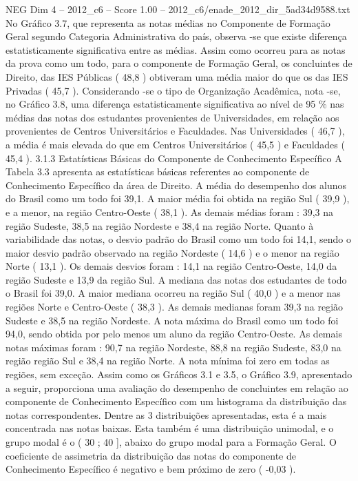 \begin{textsample}{NEG Dim 4 – 2012\_c6 – Score 1.00 – 2012\_c6/enade\_2012\_dir\_5ad34d9588.txt}
No Gráfico 3.7, que representa as notas médias no Componente de Formação Geral segundo Categoria Administrativa do país, observa -se que existe diferença estatisticamente significativa entre as médias.
Assim como ocorreu para as notas da prova como um todo, para o componente de Formação Geral, os concluintes de Direito, das IES Públicas ( 48,8 ) obtiveram uma média maior do que os das IES Privadas ( 45,7 ).
Considerando -se o tipo de Organização Acadêmica, nota -se, no Gráfico 3.8, uma diferença estatisticamente significativa ao nível de 95 \% nas médias das notas dos estudantes provenientes de Universidades, em relação aos provenientes de Centros Universitários e Faculdades.
Nas Universidades ( 46,7 ), a média é mais elevada do que em Centros Universitários ( 45,5 ) e Faculdades ( 45,4 ). 3.1.3 Estatísticas Básicas do Componente de Conhecimento Específico A Tabela 3.3 apresenta as estatísticas básicas referentes ao componente de Conhecimento Específico da área de Direito.
A média do desempenho dos alunos do Brasil como um todo foi 39,1.
A maior média foi obtida na região Sul ( 39,9 ), e a menor, na região Centro-Oeste ( 38,1 ).
As demais médias foram : 39,3 na região Sudeste, 38,5 na região Nordeste e 38,4 na região Norte.
Quanto à variabilidade das notas, o desvio padrão do Brasil como um todo foi 14,1, sendo o maior desvio padrão observado na região Nordeste ( 14,6 ) e o menor na região Norte ( 13,1 ).
Os demais desvios foram : 14,1 na região Centro-Oeste, 14,0 da região Sudeste e 13,9 da região Sul.
A mediana das notas dos estudantes de todo o Brasil foi 39,0.
A maior mediana ocorreu na região Sul ( 40,0 ) e a menor nas regiões Norte e Centro-Oeste ( 38,3 ).
As demais medianas foram 39,3 na região Sudeste e 38,5 na região Nordeste.
A nota máxima do Brasil como um todo foi 94,0, sendo obtida por pelo menos um aluno da região Centro-Oeste.
As demais notas máximas foram : 90,7 na região Nordeste, 88,8 na região Sudeste, 83,0 na região região Sul e 38,4 na região Norte.
A nota mínima foi zero em todas as regiões, sem exceção.
Assim como os Gráficos 3.1 e 3.5, o Gráfico 3.9, apresentado a seguir, proporciona uma avaliação do desempenho de concluintes em relação ao componente de Conhecimento Específico com um histograma da distribuição das notas correspondentes.
Dentre as 3 distribuições apresentadas, esta é a mais concentrada nas notas baixas.
Esta também é uma distribuição unimodal, e o grupo modal é o ( 30 ; 40 ], abaixo do grupo modal para a Formação Geral.
O coeficiente de assimetria da distribuição das notas do componente de Conhecimento Específico é negativo e bem próximo de zero ( -0,03 ).

\end{textsample}

